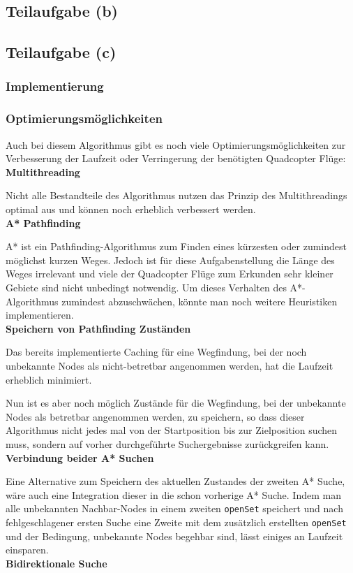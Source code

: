 \documentclass[a4paper,12pt]{article}
\newcommand{\code}{\texttt}
\begin{document}
\subsection{Teilaufgabe (b)}

\subsection{Teilaufgabe (c)}
\subsubsection{Implementierung}
\subsubsection{Optimierungsmöglichkeiten}
Auch bei diesem Algorithmus gibt es noch viele Optimierungsmöglichkeiten zur Verbesserung der Laufzeit oder Verringerung der benötigten Quadcopter Flüge:
\\[0.4cm]
\textbf{Multithreading}

Nicht alle Bestandteile des Algorithmus nutzen das Prinzip des Multithreadings optimal aus und können noch erheblich verbessert werden.
\\[0.4cm]
\textbf{A* Pathfinding}

A* ist ein Pathfinding-Algorithmus zum Finden eines kürzesten oder zumindest möglichst kurzen Weges. Jedoch ist für diese Aufgabenstellung die Länge des Weges irrelevant und viele der Quadcopter Flüge zum Erkunden sehr kleiner Gebiete sind nicht unbedingt notwendig. Um dieses Verhalten des A*-Algorithmus zumindest abzuschwächen, könnte man noch weitere Heuristiken implementieren.
\\[0.4cm]
\textbf{Speichern von Pathfinding Zuständen}

Das bereits implementierte Caching für eine Wegfindung, bei der noch unbekannte Nodes als nicht-betretbar angenommen werden, hat die Laufzeit erheblich minimiert.

Nun ist es aber noch möglich Zustände für die Wegfindung, bei der unbekannte Nodes als betretbar angenommen werden, zu speichern, so dass dieser Algorithmus nicht jedes mal von der Startposition bis zur Zielposition suchen muss, sondern auf vorher durchgeführte Suchergebnisse zurückgreifen kann.
\\[0.4cm]
\textbf{Verbindung beider A* Suchen}

Eine Alternative zum Speichern des aktuellen Zustandes der zweiten A* Suche, wäre auch eine Integration dieser in die schon vorherige A* Suche. Indem man alle unbekannten Nachbar-Nodes in einem zweiten \code{openSet} speichert und nach fehlgeschlagener ersten Suche eine Zweite mit dem zusätzlich erstellten \code{openSet} und der Bedingung, unbekannte Nodes begehbar sind, lässt einiges an Laufzeit einsparen.
\\[0.4cm]
\textbf{Bidirektionale Suche}
\end{document}
